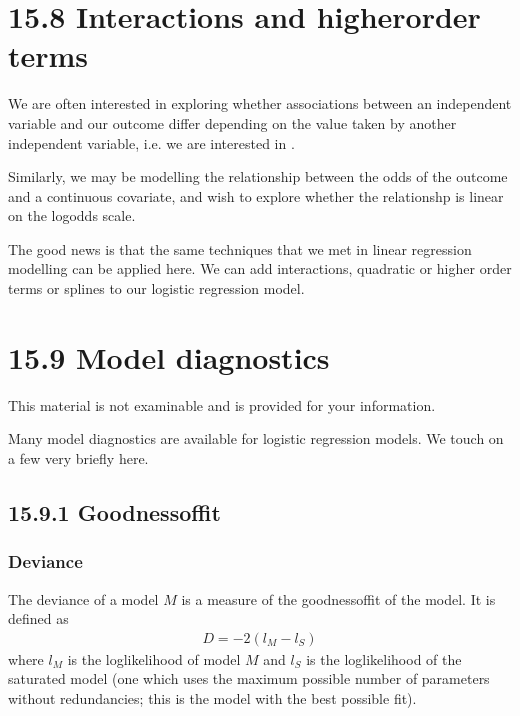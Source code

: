 \documentclass[letterpaper,10pt,english]{jupyterBook}
\begin{document}
\section{15.8 Interactions and higher\sphinxhyphen{}order terms}
\label{\detokenize{15.i. Logistic Regression:interactions-and-higher-order-terms}}\label{\detokenize{15.i. Logistic Regression::doc}}
\sphinxAtStartPar
We are often interested in exploring whether associations between an independent variable and our outcome differ depending on the value taken by another independent variable, i.e. we are interested in .

\sphinxAtStartPar
Similarly, we may be modelling the relationship between the odds of the outcome and a continuous covariate, and wish to explore whether the relationshp is linear on the log\sphinxhyphen{}odds scale.

\sphinxAtStartPar
The good news is that the same techniques that we met in linear regression modelling can be applied here. We can add interactions, quadratic or higher order terms or splines to our logistic regression model.


\section{15.9 Model diagnostics}
\label{\detokenize{15.j. Logistic Regression:model-diagnostics}}\label{\detokenize{15.j. Logistic Regression::doc}}
\sphinxAtStartPar
This material is not examinable and is provided for your information.

\sphinxAtStartPar
Many model diagnostics are available for logistic regression models. We touch on a few very briefly here.


\subsection{15.9.1 Goodness\sphinxhyphen{}of\sphinxhyphen{}fit}
\label{\detokenize{15.j. Logistic Regression:goodness-of-fit}}

\subsubsection{Deviance}
\label{\detokenize{15.j. Logistic Regression:deviance}}
\sphinxAtStartPar
The deviance of a model \(M\) is a measure of the goodness\sphinxhyphen{}of\sphinxhyphen{}fit of the model. It is defined as
\begin{equation*}
\begin{split}
D = -2(l_M - l_S)
\end{split}
\end{equation*}
\sphinxAtStartPar
where \(l_M\)  is the log\sphinxhyphen{}likelihood of model \(M\) and \(l_S\) is the log\sphinxhyphen{}likelihood of the saturated model (one which uses the maximum possible number of parameters without redundancies; this is the model with the best possible fit).
\end{document}
